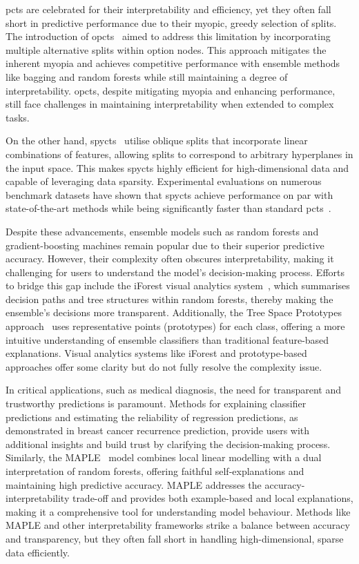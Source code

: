 \documentclass[3p,review,authoryear]{elsarticle}
\begin{document}
\Glspl{pct} are celebrated for their interpretability and efficiency, yet they often fall short in predictive performance due to their myopic, greedy selection of splits.
The introduction of \glspl{opct}~\citep{Stepisnik_2020} aimed to address this limitation by incorporating multiple alternative splits within option nodes.
This approach mitigates the inherent myopia and achieves competitive performance with ensemble methods like bagging and random forests while still maintaining a degree of interpretability.
\Glspl{opct}, despite mitigating myopia and enhancing performance, still face challenges in maintaining interpretability when extended to complex tasks.

On the other hand, \glspl{spyct}~\citep{Stepi_nik_2021} utilise oblique splits that incorporate linear combinations of features, allowing splits to correspond to arbitrary hyperplanes in the input space.
This makes \glspl{spyct} highly efficient for high-dimensional data and capable of leveraging data sparsity.
Experimental evaluations on numerous benchmark datasets have shown that \glspl{spyct} achieve performance on par with state-of-the-art methods while being significantly faster than standard \glspl{pct}~\citep{Andonovikj_2024}.

Despite these advancements, ensemble models such as random forests and gradient-boosting machines remain popular due to their superior predictive accuracy.
However, their complexity often obscures interpretability, making it challenging for users to understand the model’s decision-making process.
Efforts to bridge this gap include the iForest visual analytics system~\citep{Zhao_2019}, which summarises decision paths and tree structures within random forests, thereby making the ensemble's decisions more transparent.
Additionally, the Tree Space Prototypes approach~\citep{Tan_2020} uses representative points (prototypes) for each class, offering a more intuitive understanding of ensemble classifiers than traditional feature-based explanations.
Visual analytics systems like iForest and prototype-based approaches offer some clarity but do not fully resolve the complexity issue.

In critical applications, such as medical diagnosis, the need for transparent and trustworthy predictions is paramount.
Methods for explaining classifier predictions and estimating the reliability of regression predictions, as demonstrated in breast cancer recurrence prediction, provide users with additional insights and build trust by clarifying the decision-making process.
Similarly, the MAPLE~\citep{plumb2018model} model combines local linear modelling with a dual interpretation of random forests, offering faithful self-explanations and maintaining high predictive accuracy.
MAPLE addresses the accuracy-interpretability trade-off and provides both example-based and local explanations, making it a comprehensive tool for understanding model behaviour.
Methods like MAPLE and other interpretability frameworks strike a balance between accuracy and transparency, but they often fall short in handling high-dimensional, sparse data efficiently.
\end{document}
